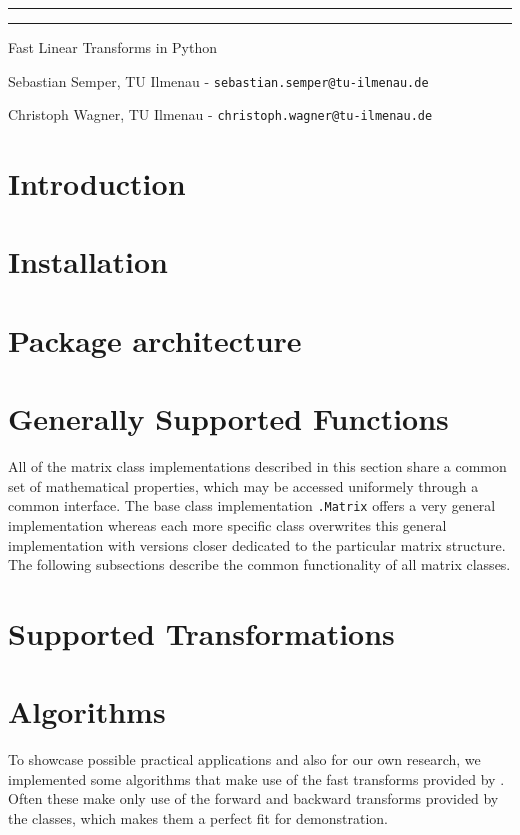 \documentclass[10pt,english,twoside]{article}
\begin{document}
\begin{center}

\thispagestyle{empty}
\vspace{13mm}

\hrule

\vspace{13mm}
\Huge{\fm{}}
\vspace{13mm}

\hrule

\vspace{3mm}
\Large{Fast Linear Transforms in Python}
\vspace{3mm}
%
%

\normalsize Sebastian Semper, TU Ilmenau -
            \texttt{sebastian.semper@tu-ilmenau.de}

\normalsize Christoph Wagner, TU Ilmenau -
            \texttt{christoph.wagner@tu-ilmenau.de}

\end{center}
%
%
\newpage
%
\tableofcontents
%
\newpage
%
%
\begin{multicols}{2}
\section{Introduction}

%
%
%
\section{Installation}

%
%
%
\section{Package architecture}

%
%
%
\clearpage
\section{Generally Supported Functions}
%
All of the matrix class implementations described in this section share a
common set of mathematical properties, which may be accessed uniformely through
a common interface. The base class implementation \texttt{\fm.Matrix} offers
a very general implementation whereas each more specific class overwrites this
general implementation with versions closer dedicated to the particular matrix
structure.
The following subsections describe the common functionality of all matrix
classes.


\clearpage
\section{Supported Transformations}
%

%
%
%
\clearpage
\section{Algorithms}
%
To showcase possible practical applications and also for our own research, we
implemented some algorithms that make use of the fast transforms provided by
\fm{}. Often these make only use of the forward and backward transforms
provided by the \fm{} classes, which makes them a perfect fit for demonstration.
%

%
%
%
\end{multicols}
\end{document}
